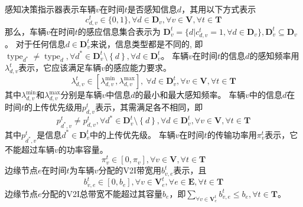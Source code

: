 感知决策指示器表示车辆$v$在时间$t$是否感知信息$d$，其用以下方式表示
\begin{equation}
	c_{d, v}^t \in \{0, 1\}, \forall d \in \mathbf{D}_{v}, \forall v \in \mathbf{V}, \forall t \in \mathbf{T}
	\label{equ 4-1} 
\end{equation}
那么，车辆$v$在时间$t$的感应信息集合表示为 $\mathbf{D}_v^t = \{ d | c_{d, v}^{t} = 1, \forall d \in \mathbf{D}_v \}, \mathbf{D}_v^t \subseteq \mathbf{D}_v$。
对于任何信息$d \in \mathbf{D}_v^t$来说，信息类型都是不同的, 即$\operatorname{type}_{d^*} \neq \operatorname{type}_{d}, \forall d^* \in \mathbf{D}_v^t \setminus \left\{ d\right \}, \forall d \in \mathbf{D}_v^t$。
车辆$v$在时间$t$的信息$d$的感知频率用$\lambda_{d, v}^t$表示，它应该满足车辆$v$的感应能力要求。
\begin{equation}
	\lambda_{d, v}^{t} \in [\lambda_{d, v}^{\min} , \lambda_{d, v}^{\max} ], \ \forall d \in \mathbf{D}_v^t, \forall v \in \mathbf{V}, \forall t \in \mathbf{T}
\end{equation}
其中$\lambda_{d, v}^{\min}$和$\lambda_{d, v}^{\max}$分别是车辆$v$中信息${d}$的最小和最大感知频率。
车辆$v$中的信息$d$在时间$t$的上传优先级用$p_{d, v}^t$表示，其需满足各不相同，即
\begin{equation}
	{p}_{d^*, v}^t \neq {p}_{d, v}^t, \forall d^* \in \mathbf{D}_v^t \setminus \left\{ d\right \}, \forall d \in \mathbf{D}_v^t, \forall v \in \mathbf{V}, \forall t \in \mathbf{T}
\end{equation}
其中${p}_{d^*, v}^t$是信息$d^* \in \mathbf{D}_v^t$中的上传优先级。
车辆$v$在时间$t$的传输功率用$\pi_{v}^t$表示，它不能超过车辆$v$的功率容量。
\begin{equation}
	\pi_v^t \in \left[ 0 , \pi_v \right ], \forall v \in \mathbf{V}, \forall t \in \mathbf{T}
\end{equation}
边缘节点$e$在时间$t$为车辆$v$分配的V2I带宽用$b_{v, e}^t$表示，且 
\begin{equation}
	b_{v, e}^t \in \left [0, b_e \right], \forall v \in \mathbf{V}_e^{t}, \forall e \in \mathbf{E}, \forall t \in \mathbf{T}
	\label{equ 4-5} 
\end{equation}
边缘节点$e$分配的V2I总带宽不能超过其容量$b_e$，即${\sum_{\forall v \in \mathbf{V}_e^{t}} b_{v, e}^t} \leq b_e, \forall t \in \mathbf{T}$。

